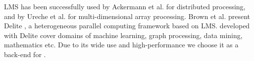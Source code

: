 \documentclass[paper.tex]{subfiles}
\begin{document}
LMS has been successfully used by Ackermann et al. \cite{ackermann_jet:_2012} for distributed processing, and by Ureche et al. \cite{ureche_stagedsac:_2012} for multi-dimensional array processing. Brown et al. present Delite \cite{brown_heterogeneous_2011,composition-ecoop2013}, a heterogeneous parallel computing
framework based on LMS. \edsls developed with Delite cover domains of machine learning, graph processing, data mining, mathematics etc. Due to its wide use and high-performance we choose it as a back-end for \tool.
\end{document}
